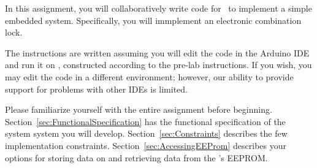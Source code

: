 


\usepackage{enumitem}
\usepackage{addfont}




\renewcommand{\labnumber}{\capstonelabnumber}
\renewcommand{\labname}{Implementing an Electronic Combination Lock}
\renewcommand{\shortlabname}{combolock -- grouplab}
\renewcommand{\collaborationrules}{\capstonelabcollaboration}
\renewcommand{\duedate}{\capstonelabdue}
\newcommand{\nano}{\developmentboard} %
\renewcommand{\runtimeenvironment}{\capstonelabenvironment}
\pagelayout

\labidentifier

In this assignment, you will collaboratively write code for \runtimeenvironment\
to implement a simple embedded system. Specifically, you will immplement an
electronic combination lock.

The instructions are written assuming you will edit the code in the Arduino IDE
and run it on \runtimeenvironment, constructed according to the pre-lab
instructions. If you wish, you may edit the code in a different environment;
however, our ability to provide support for problems with other IDEs is limited.

Please familiarize yourself with the entire assignment before beginning.
Section~\ref{sec:FunctionalSpecification} has the functional specification of
the system system you will develop. Section~\ref{sec:Constraints} describes
the few implementation constraints. Section~\ref{sec:AccessingEEProm} describes
your options for storing data on and retrieving data from the \nano's EEPROM.

